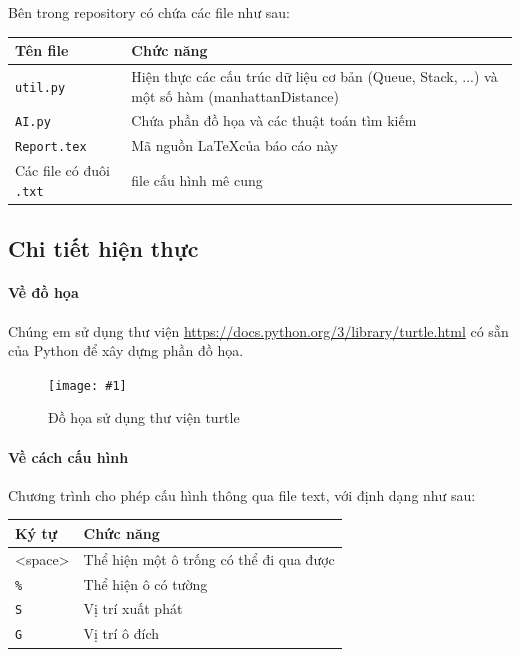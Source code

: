 \documentclass[a4paper]{article}
\newcommand{\Image}[3]{
	\begin{figure}[H]
		\begin{center}
			\texttt{[image: \#1]}
			\caption{#3}
		\end{center}
	\end{figure}
}
\begin{document}
	Bên trong repository có chứa các file như sau:
	\begin{center}
		\begin{tabular}{|p{3cm}|p{9cm}|}
			\hline
			\textbf{Tên file} & \textbf{Chức năng}\\
			\hline
			\texttt{util.py} & Hiện thực các cấu trúc dữ liệu cơ bản (Queue, Stack, ...) và một số hàm (manhattanDistance)\\
			\hline
			\texttt{AI.py} & Chứa phần đồ họa và các thuật toán tìm kiếm\\
			\hline
			\texttt{Report.tex} & Mã nguồn \LaTeX của báo cáo này\\
			\hline
			Các file có đuôi \texttt{.txt} & file cấu hình mê cung\\
			\hline
		\end{tabular}
	\end{center}

	\subsection{Chi tiết hiện thực}

	\paragraph{Về đồ họa}\par
	Chúng em sử dụng thư viện \href{turtle}{https://docs.python.org/3/library/turtle.html} có sẵn của Python để xây dựng phần đồ họa.
	\Image{Image/Demo.png}{1}{Đồ họa sử dụng thư viện turtle \label{Figure:Demo}}

	\paragraph{Về cách cấu hình}\par
	Chương trình cho phép cấu hình thông qua file text, với định dạng như sau:
	\begin{center}
		\begin{tabular}{|p{3cm}|p{9cm}|}
			\hline
			\textbf{Ký tự} & \textbf{Chức năng}\\
			\hline
			<space> & Thể hiện một ô trống có thể đi qua được\\
			\hline
			\texttt{\%} & Thể hiện ô có tường\\
			\hline
			\texttt{S} & Vị trí xuất phát\\
			\hline
			\texttt{G} & Vị trí ô đích\\
			\hline
		\end{tabular}
	\end{center}
\end{document}
